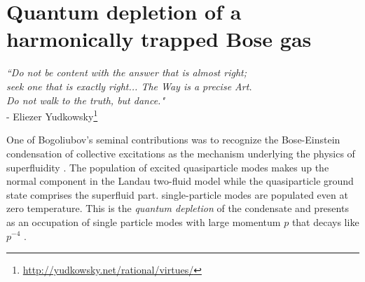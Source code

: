\chapter{Quantum depletion of a harmonically trapped Bose gas}
\label{chap:QD}

\begin{adjustwidth}{3cm}{0cm}
\begin{flushright}
\emph{``Do not be content with the answer that is almost right; \\
	seek one that is exactly right... The Way is a precise Art.\\
	Do not walk to the truth, but dance."} 
	\\- Eliezer Yudkowsky\footnote{\url{http://yudkowsky.net/rational/virtues/}}
\end{flushright}
\end{adjustwidth}




	One of Bogoliubov's seminal contributions was to recognize the Bose-Einstein condensation of collective excitations as the mechanism underlying the physics of superfluidity \cite{Bogolubov47}.
	The population of excited quasiparticle modes makes up the normal component in the Landau two-fluid model while the %
	quasiparticle ground state comprises the superfluid part.  
	 single-particle modes %
	are populated even at zero temperature. %
	This is the \emph{quantum depletion} of the condensate and presents as an occupation of single particle modes with large momentum $p$ that decays like $p^{-4}$ \cite{PitaevskiiStringari,Decamp18}.

